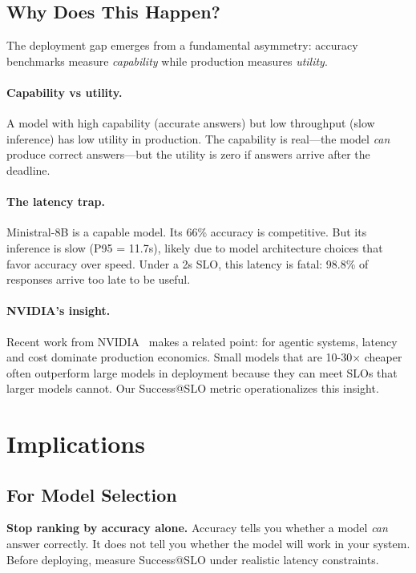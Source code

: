 \documentclass[11pt]{article}
\begin{document}
\subsection{Why Does This Happen?}

The deployment gap emerges from a fundamental asymmetry: accuracy benchmarks measure \emph{capability} while production measures \emph{utility}.

\paragraph{Capability vs utility.}
A model with high capability (accurate answers) but low throughput (slow inference) has low utility in production.
The capability is real---the model \emph{can} produce correct answers---but the utility is zero if answers arrive after the deadline.

\paragraph{The latency trap.}
Ministral-8B is a capable model.
Its 66\% accuracy is competitive.
But its inference is slow (P95 = 11.7s), likely due to model architecture choices that favor accuracy over speed.
Under a 2s SLO, this latency is fatal: 98.8\% of responses arrive too late to be useful.

\paragraph{NVIDIA's insight.}
Recent work from NVIDIA~\cite{nvidia2025slm} makes a related point: for agentic systems, latency and cost dominate production economics.
Small models that are 10-30$\times$ cheaper often outperform large models in deployment because they can meet SLOs that larger models cannot.
Our Success@SLO metric operationalizes this insight.

\section{Implications}

\subsection{For Model Selection}

\textbf{Stop ranking by accuracy alone.}
Accuracy tells you whether a model \emph{can} answer correctly.
It does not tell you whether the model will work in your system.
Before deploying, measure Success@SLO under realistic latency constraints.
\end{document}
